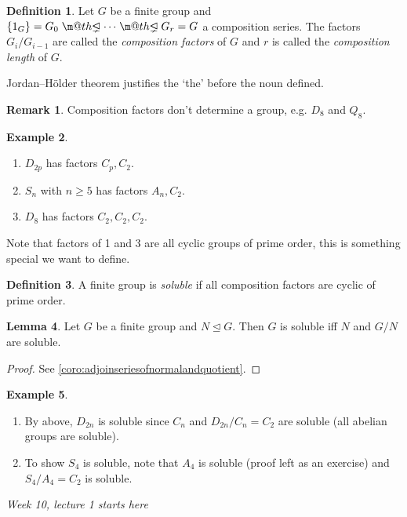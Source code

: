 \documentclass[a4paper]{article}
\makeatletter
\DeclareRobustCommand{\pns}{\mathrel{\text{$\m@th\proper@ideal$}}}
\newcommand{\proper@ideal}{%
  \ooalign{$\lneq$\cr\raise.22ex\hbox{$\lhd$}\cr}%
}
\theoremstyle{definition}
\newtheorem{defn}{Definition}[subsection]
\newtheorem{lemma}[defn]{Lemma}
\newtheorem{example}[defn]{Example}
\newtheorem*{remark}{Remark}
\makeatother
\begin{document}
\begin{defn}
Let $G$ be a finite group and $\{1_G\}=G_0\pns\cdots\pns G_r=G$ a composition series. The factors $G_i/G_{i-1}$  are called the \textit{composition factors} of $G$ and $r$ is called the \textit{composition length} of $G$.

Jordan–Hölder theorem justifies the `the' before the noun defined.
\end{defn}
\begin{remark}
Composition factors don't determine a group, e.g. $D_8$ and $Q_8$.
\end{remark}
\begin{example}
\begin{enumerate}
\item $D_{2p}$ has factors $C_p,C_2$.
\item $S_n$ with $n\geq 5$ has factors $A_n,C_2$.
\item $D_8$ has factors $C_2,C_2,C_2$.
\end{enumerate}
Note that factors of 1 and 3 are all cyclic groups of prime order, this is something special we want to define.
\end{example}
\begin{defn}
A finite group is \textit{soluble} if all composition factors are cyclic of prime order.
\end{defn}

\begin{lemma}
\label{lemma:GsoliffNGNsol}
Let $G$ be a finite group and $N\unlhd G$. Then $G$ is soluble iff $N$ and $G/N$ are soluble.
\end{lemma}
\begin{proof}
See \ref{coro:adjoinseriesofnormalandquotient}.
\end{proof}

\begin{example}
\begin{enumerate}
\item By above, $D_{2n}$ is soluble since $C_n$ and $D_{2n}/C_n=C_2$ are soluble (all abelian groups are soluble).
\item To show $S_4$ is soluble, note that $A_4$ is soluble (proof left as an exercise) and $S_4/A_4=C_2$ is soluble.
\end{enumerate}
\end{example}

\begin{flushright}
\textit{Week 10, lecture 1 starts here}
\end{flushright}
\end{document}
